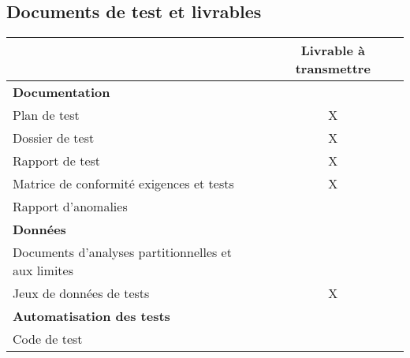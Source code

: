 \subsection{Documents de test et livrables}
\label{sec:process:livrables}

\noindent\begin{longtable}[c]{|l|c|}
\hline
 & {\bf Livrable à transmettre} \\
\hline
{\bf Documentation} & \\
\hline
Plan de test & X \\
\hline
Dossier de test & X \\
\hline
Rapport de test & X \\
\hline
Matrice de conformité exigences et tests & X \\
\hline
Rapport d’anomalies & \\
\hline
{\bf Données} & \\
\hline
Documents d'analyses partitionnelles et aux limites & \\
\hline
Jeux de données de tests & X\\
\hline
{\bf Automatisation des tests} & \\
\hline
Code de test & \\
\hline
\end{longtable}

